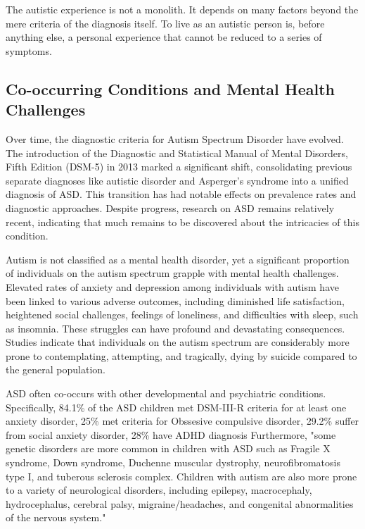 The autistic experience is not a monolith. It depends on many factors beyond the mere criteria of the diagnosis itself. To live as an autistic person is, before anything else, a personal experience that cannot be reduced to a series of symptoms. 

\subsection{Co-occurring Conditions and Mental Health Challenges}

Over time, the diagnostic criteria for Autism Spectrum Disorder have evolved. The introduction of the Diagnostic and Statistical Manual of Mental Disorders, Fifth Edition (DSM-5) in 2013 marked a significant shift, consolidating previous separate diagnoses like autistic disorder and Asperger's syndrome into a unified diagnosis of ASD. This transition has had notable effects on prevalence rates and diagnostic approaches. Despite progress, research on ASD remains relatively recent, indicating that much remains to be discovered about the intricacies of this condition.

Autism is not classified as a mental health disorder, yet a significant proportion of individuals on the autism spectrum grapple with mental health challenges. Elevated rates of anxiety and depression among individuals with autism have been linked to various adverse outcomes, including diminished life satisfaction, heightened social challenges, feelings of loneliness, and difficulties with sleep, such as insomnia. These struggles can have profound and devastating consequences. Studies indicate that individuals on the autism spectrum are considerably more prone to contemplating, attempting, and tragically, dying by suicide compared to the general population.

ASD often co-occurs with other developmental and psychiatric conditions.
Specifically, 84.1\% of the ASD children met DSM-III-R criteria for at least one anxiety disorder, 25\% met criteria for Obssesive compulsive disorder\cite{2009AnxietyChildrenAdolescents}, 29.2\% suffer from social anxiety disorder, 28\% have ADHD diagnosis\cite{2008PsychiatricDisordersChildren} Furthermore, "some genetic disorders are more common in children with ASD such as Fragile X syndrome, Down syndrome, Duchenne muscular dystrophy, neurofibromatosis type I, and tuberous sclerosis complex. Children with autism are also more prone to a variety of neurological disorders, including epilepsy, macrocephaly, hydrocephalus, cerebral palsy, migraine/headaches, and congenital abnormalities of the nervous system."\cite{2021AutismMedicalComorbidities}

